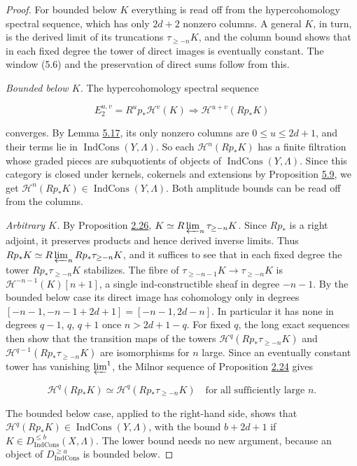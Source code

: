 \documentclass[11pt]{article}
\providecommand{\Dic}{}\renewcommand{\Dic}{D_{\IndCons}}
\providecommand{\IndCons}{}\renewcommand{\IndCons}{\operatorname{IndCons}}
\begin{document}
\begin{proof}[{Proof}]\label{bp468}%
For bounded below \(K\) everything is read off from the hypercohomology spectral sequence, which has only \(2d+2\) nonzero columns. A general \(K\), in turn, is the derived limit of its truncations \(\tau_{\geq-n}K\), and the column bound shows that in each fixed degree the tower of direct images is eventually constant. The window (5.6) and the preservation of direct sums follow from this.

\emph{Bounded below \(K\).} The hypercohomology spectral sequence

\[
E_2^{u,v}=R^up_*\mathcal H^v(K)\Longrightarrow\mathcal H^{u+v}(Rp_*K)
\]

converges. By Lemma \hyperref[bp463]{5.17}, its only nonzero columns are \(0\leq u\leq2d+1\), and their terms lie in \(\IndCons(Y,\Lambda)\). So each \(\mathcal H^n(Rp_*K)\) has a finite filtration whose graded pieces are subquotients of objects of \(\IndCons(Y,\Lambda)\). Since this category is closed under kernels, cokernels and extensions by Proposition \hyperref[bp433]{5.9}, we get \(\mathcal H^n(Rp_*K)\in\IndCons(Y,\Lambda)\). Both amplitude bounds can be read off from the columns.

\emph{Arbitrary \(K\).} By Proposition \hyperref[bp77]{2.26}, \(K\simeq R\varprojlim_n
\tau_{\geq-n}K\). Since \(Rp_*\) is a right adjoint, it preserves products and hence derived inverse limits. Thus \(Rp_*K\simeq R\varprojlim_nRp_*\tau_{\geq-n}K\), and it suffices to see that in each fixed degree the tower \(Rp_*\tau_{\geq-n}K\) stabilizes. The fibre of \(\tau_{\geq-n-1}K\to\tau_{\geq-n}K\) is \(\mathcal H^{-n-1}(K)[n+1]\), a single ind-constructible sheaf in degree \(-n-1\). By the bounded below case its direct image has cohomology only in degrees \([-n-1,-n-1+2d+1]=[-n-1,2d-n]\). In particular it has none in degrees \(q-1\), \(q\), \(q+1\) once \(n>2d+1-q\). For fixed \(q\), the long exact sequences then show that the transition maps of the towers \(\mathcal H^q(Rp_*\tau_{\geq-n}K)\) and \(\mathcal H^{q-1}(Rp_*\tau_{\geq-n}K)\) are isomorphisms for \(n\) large. Since an eventually constant tower has vanishing \(\varprojlim^1\), the Milnor sequence of Proposition \hyperref[bp71]{2.24} gives

\[
\mathcal H^q(Rp_*K)\simeq
\mathcal H^q(Rp_*\tau_{\geq-n}K)\quad\text{for all sufficiently large }n.
\]

The bounded below case, applied to the right-hand side, shows that \(\mathcal H^q(Rp_*K)\in\IndCons(Y,\Lambda)\), with the bound \(b+2d+1\) if \(K\in
\Dic^{\leq b}(X,\Lambda)\). The lower bound needs no new argument, because an object of \(\Dic^{\geq a}\) is bounded below.


\end{proof}
\end{document}
